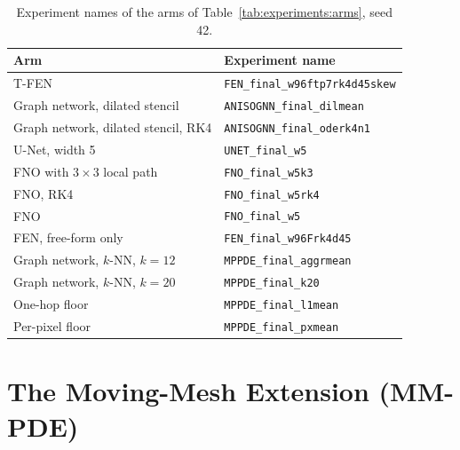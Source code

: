 \begin{table}[h]
  \centering
  \caption[Experiment names of the reported arms.]{%
    Experiment names of the arms of Table~\ref{tab:experiments:arms}, seed
    42.}
  \label{tab:appendix:runs}
  \small
  \begin{tabular}{l l}
    \toprule
    Arm & Experiment name \\
    \midrule
    T-FEN                               & \texttt{FEN\_final\_w96ftp7rk4d45skew} \\
    Graph network, dilated stencil      & \texttt{ANISOGNN\_final\_dilmean} \\
    Graph network, dilated stencil, RK4 & \texttt{ANISOGNN\_final\_oderk4n1} \\
    U-Net, width 5                      & \texttt{UNET\_final\_w5} \\
    FNO with $3 \times 3$ local path    & \texttt{FNO\_final\_w5k3} \\
    FNO, RK4                            & \texttt{FNO\_final\_w5rk4} \\
    FNO                                 & \texttt{FNO\_final\_w5} \\
    FEN, free-form only                 & \texttt{FEN\_final\_w96Frk4d45} \\
    Graph network, $k$-NN, $k = 12$     & \texttt{MPPDE\_final\_aggrmean} \\
    Graph network, $k$-NN, $k = 20$     & \texttt{MPPDE\_final\_k20} \\
    One-hop floor                       & \texttt{MPPDE\_final\_l1mean} \\
    Per-pixel floor                     & \texttt{MPPDE\_final\_pxmean} \\
    \bottomrule
  \end{tabular}
\end{table}


\cleardoubleoddpage
\chapter{The Moving-Mesh Extension (MM-PDE)}
\label{app:mm-pde}


